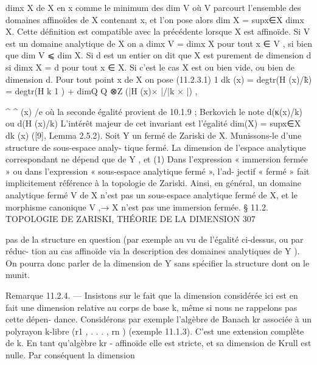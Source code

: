 \documentclass[
  10pt,
]{article}
\newenvironment{Shaded}{}{}
\newcommand{\NormalTok}[1]{#1}
\begin{document}
\begin{Shaded}
\begin{Highlighting}[]
\NormalTok{dimx X de X en x comme le minimum des dim V où V parcourt l’ensemble des domaines}
\NormalTok{affinoïdes de X contenant x, et l’on pose alors dim X = supx∈X dimx X. Cette définition}
\NormalTok{est compatible avec la précédente lorsque X est affinoïde. Si V est un domaine analytique}
\NormalTok{de X on a dimx V = dimx X pour tout x ∈ V , si bien que dim V ⩽ dim X. Si d est un}
\NormalTok{entier on dit que X est purement de dimension d si dimx X = d pour tout x ∈ X. Si}
\NormalTok{c’est le cas X est ou bien vide, ou bien de dimension d.}
\NormalTok{   Pour tout point x de X on pose}
\NormalTok{(11.2.3.1)}
\NormalTok{                                                   1}
\NormalTok{      dk (x) = degtr(H      (x)/k̃) = degtr(H        k 1 ) + dimQ Q ⊗Z (|H (x)× |/|k × |) ,}
                                                                                         
\NormalTok{                         \^{}                  \^{}  (x) /e}
\NormalTok{où la seconde égalité provient de 10.1.9 ; Berkovich le note d(κ(x)/k) ou d(H (x)/k)}
\NormalTok{L’intérêt majeur de cet invariant est l’égalité dim(X) = supx∈X dk (x) ([9], Lemma 2.5.2).}
\NormalTok{   Soit Y un fermé de Zariski de X. Munissons{-}le d’une structure de sous{-}espace analy{-}}
\NormalTok{tique fermé. La dimension de l’espace analytique correspondant ne dépend que de Y , et}
\NormalTok{(1)}
\NormalTok{   Dans l’expression « immersion fermée » ou dans l’expression « sous{-}espace analytique fermé », l’ad{-}}
\NormalTok{jectif « fermé » fait implicitement référence à la topologie de Zariski. Ainsi, en général, un domaine}
\NormalTok{analytique fermé V de X n’est pas un sous{-}espace analytique fermé de X, et le morphisme canonique}
\NormalTok{V ,→ X n’est pas une immersion fermée.}
\NormalTok{                 § 11.2. TOPOLOGIE DE ZARISKI, THÉORIE DE LA DIMENSION                     307}

\NormalTok{pas de la structure en question (par exemple au vu de l’égalité ci{-}dessus, ou par réduc{-}}
\NormalTok{tion au cas affinoïde via la description des domaines analytiques de Y ). On pourra donc}
\NormalTok{parler de la dimension de Y sans spécifier la structure dont on le munit.}


\NormalTok{Remarque 11.2.4. — Insistons sur le fait que la dimension considérée ici est en fait}
\NormalTok{une dimension relative au corps de base k, même si nous ne rappelons pas cette dépen{-}}
\NormalTok{dance. Considérons par exemple l’algèbre de Banach kr associée à un polyrayon k{-}libre}
\NormalTok{(r1 , . . . , rn ) (exemple 11.1.3). C’est une extension complète de k. En tant qu’algèbre kr {-}}
\NormalTok{affinoïde elle est stricte, et sa dimension de Krull est nulle. Par conséquent la dimension}
\end{Highlighting}
\end{Shaded}
\end{document}
